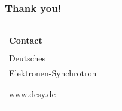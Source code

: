 \begin{frame}
\frametitle{Thank you!}
\vfill{}
\vspace*{3.5cm}


\fontsize{8}{9}\selectfont
\begin{columns}
	\hspace*{-0.8em}
	\hspace*{-1em}  %
	\begin{column}{\textwidth}
		\begin{tabular}{lll}
		\textbf{Contact}&\hspace*{0.5cm} & \\
						&\hspace*{0.5cm} & \\
		\hspace*{-0.4mm}\DESYWord{}Deutsches&\hspace*{0.5cm} & \AUTHOR \\
		Elektronen-Synchrotron &\hspace*{0.5cm} & \ORCiD{\ORCID}\\
							&\hspace*{0.5cm} & \GROUP  \\
							&\hspace*{0.5cm} & \MailTo{\EMAIL}\\
		www.desy.de			&\hspace*{0.5cm} & \PHONE \\
							&\hspace*{0.5cm} & \DOIlink{\DOI}\\
		\end{tabular}
	\end{column}
\end{columns}


\end{frame}


